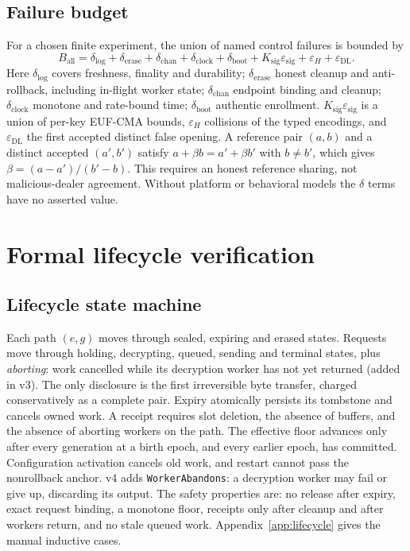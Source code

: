 \documentclass[pdflatex,sn-mathphys-num]{sn-jnl}
\theoremstyle{plain}
\theoremstyle{definition}
\newcommand{\code}[1]{\texttt{#1}}
\begin{document}
\subsection{Failure budget}
For a chosen finite experiment, the union of named control failures is bounded by
\begin{equation}\label{eq:budget}
 B_{\mathrm{all}}=\delta_{\mathrm{log}}+\delta_{\mathrm{erase}}+\delta_{\mathrm{chan}}+\delta_{\mathrm{clock}}+\delta_{\mathrm{boot}}+K_{\mathrm{sig}}\varepsilon_{\mathrm{sig}}+\varepsilon_H+\varepsilon_{\mathrm{DL}}.
\end{equation}
Here $\delta_{\mathrm{log}}$ covers freshness, finality and durability; $\delta_{\mathrm{erase}}$ honest cleanup and anti-rollback, including in-flight worker state; $\delta_{\mathrm{chan}}$ endpoint binding and cleanup; $\delta_{\mathrm{clock}}$ monotone and rate-bound time; $\delta_{\mathrm{boot}}$ authentic enrollment. $K_{\mathrm{sig}}\varepsilon_{\mathrm{sig}}$ is a union of per-key EUF-CMA bounds, $\varepsilon_H$ collisions of the typed encodings, and $\varepsilon_{\mathrm{DL}}$ the first accepted distinct false opening. A reference pair $(a,b)$ and a distinct accepted $(a',b')$ satisfy $a+\beta b=a'+\beta b'$ with $b\ne b'$, which gives $\beta=(a-a')/(b'-b)$. This requires an honest reference sharing, not malicious-dealer agreement. Without platform or behavioral models the $\delta$ terms have no asserted value.


\section{Formal lifecycle verification}\label{sec:formal}

\subsection{Lifecycle state machine}
Each path $(e,g)$ moves through sealed, expiring and erased states. Requests move through holding, decrypting, queued, sending and terminal states, plus \emph{aborting}: work cancelled while its decryption worker has not yet returned (added in v3). The only disclosure is the first irreversible byte transfer, charged conservatively as a complete pair. Expiry atomically persists its tombstone and cancels owned work. A receipt requires slot deletion, the absence of buffers, and the absence of aborting workers on the path. The effective floor advances only after every generation at a birth epoch, and every earlier epoch, has committed. Configuration activation cancels old work, and restart cannot pass the nonrollback anchor. v4 adds \code{WorkerAbandons}: a decryption worker may fail or give up, discarding its output. The safety properties are: no release after expiry, exact request binding, a monotone floor, receipts only after cleanup and after workers return, and no stale queued work. Appendix~\ref{app:lifecycle} gives the manual inductive cases.
\end{document}
